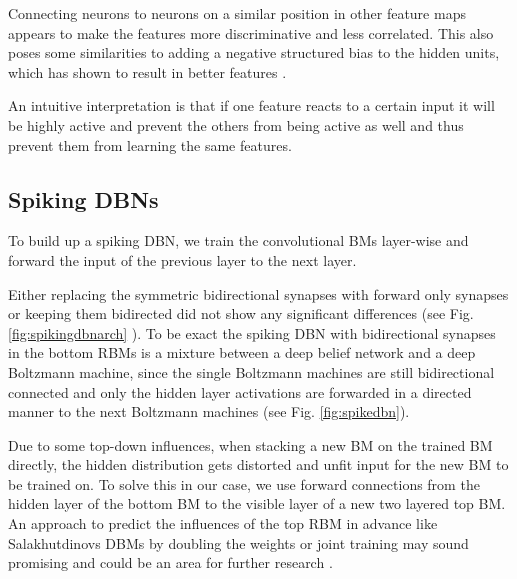 Connecting neurons to neurons on a similar position in other feature maps appears to make the features more discriminative and less correlated.
This also poses some similarities to adding a negative structured bias to the hidden units, which has shown to result in better features \cite{DBLP:journals/corr/KheradpishehGTM16, LeCun, NorouziM2009}.

An intuitive interpretation is that if one feature reacts to a certain input it will be highly active and prevent the others from being active as well and thus prevent them from learning the same features.  

\subsection{Spiking DBNs} \label{c:spikingdbn}

To build up a spiking DBN, we train the convolutional BMs layer-wise and forward the input of the previous layer to the next layer.

Either replacing the symmetric bidirectional synapses with forward only synapses or keeping them bidirected did not show any significant differences (see Fig. \ref{fig:spikingdbnarch} ). 
To be exact the spiking DBN with bidirectional synapses in the bottom RBMs is a mixture between a deep belief network and a deep Boltzmann machine, since the single Boltzmann machines are still bidirectional connected and only the hidden layer activations are forwarded in a directed manner to the next Boltzmann machines (see Fig. \ref{fig:spikedbn}).

Due to some top-down influences, when stacking a new BM on the trained BM directly, the hidden distribution gets distorted and unfit input for the new BM to be trained on. 
To solve this in our case, we use forward connections from the hidden layer of the bottom BM to the visible layer of a new two layered top BM. 
An approach to predict the influences of the top RBM in advance like Salakhutdinovs DBMs by doubling the weights or joint training may sound promising and could be an area for further research \cite{salakhutdinov2009deep}.

